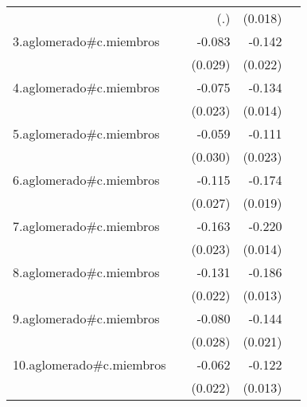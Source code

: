 {\begin{longtable}{l*{4}{D{.}{.}{-1}}}
            &                     &         (.)         &     (0.018)         &                     \\
\addlinespace
3.aglomerado#c.miembros&                     &      -0.083\sym{**} &      -0.142\sym{***}&                     \\
            &                     &     (0.029)         &     (0.022)         &                     \\
\addlinespace
4.aglomerado#c.miembros&                     &      -0.075\sym{***}&      -0.134\sym{***}&                     \\
            &                     &     (0.023)         &     (0.014)         &                     \\
\addlinespace
5.aglomerado#c.miembros&                     &      -0.059\sym{*}  &      -0.111\sym{***}&                     \\
            &                     &     (0.030)         &     (0.023)         &                     \\
\addlinespace
6.aglomerado#c.miembros&                     &      -0.115\sym{***}&      -0.174\sym{***}&                     \\
            &                     &     (0.027)         &     (0.019)         &                     \\
\addlinespace
7.aglomerado#c.miembros&                     &      -0.163\sym{***}&      -0.220\sym{***}&                     \\
            &                     &     (0.023)         &     (0.014)         &                     \\
\addlinespace
8.aglomerado#c.miembros&                     &      -0.131\sym{***}&      -0.186\sym{***}&                     \\
            &                     &     (0.022)         &     (0.013)         &                     \\
\addlinespace
9.aglomerado#c.miembros&                     &      -0.080\sym{**} &      -0.144\sym{***}&                     \\
            &                     &     (0.028)         &     (0.021)         &                     \\
\addlinespace
10.aglomerado#c.miembros&                     &      -0.062\sym{**} &      -0.122\sym{***}&                     \\
            &                     &     (0.022)         &     (0.013)         &                     \\

\end{longtable}}
